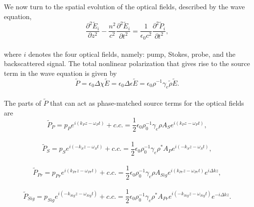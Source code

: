 We now turn to the spatial evolution of the optical fields, described by the wave equation,
\\
\begin{equation}
    \frac{\partial^{2}\tilde{E}_{i}}{\partial z^{2}} - \frac{n^{2}}{c^{2}}\frac{\partial^{2}\tilde{E}_{i}}{\partial t^{2}} = \frac{1}{\epsilon_{0}c^{2}}\frac{\partial^{2}\tilde{P}_{i}}{\partial t^{2}},
    \label{eq:Wave equation}
\end{equation}
\\
where \(i\) denotes the four optical fields, namely: pump, Stokes, probe, and the backscattered signal. The total nonlinear polarization that gives rise to the source term in the wave equation is given by
\\
\begin{equation}
    \tilde{P} = \epsilon_{0}\Delta\chi\tilde{E} = \epsilon_{0}\Delta\epsilon\tilde{E} = \epsilon_{0}\rho^{-1}\gamma_{e}\tilde{\rho}\tilde{E}.
\end{equation}
\\
The parts of \(\tilde{P}\) that can act as phase-matched source terms for the optical fields are
\\
\begin{equation}
    \tilde{P}_{P} = p_{P}e^{i(k_{P}z - \omega_{P} t)} + c.c. = \frac{1}{2}\epsilon_{0}\rho_{0}^{-1}\gamma_{e}\rho A_{S}e^{i(k_{P}z - \omega_{P} t)},
    \label{eq:Pump phase-matched source term}
\end{equation}
\\
\begin{equation}
    \tilde{P}_{S} = p_{S}e^{i(-k_{S}z - \omega_{S} t)} + c.c. = \frac{1}{2}\epsilon_{0}\rho_{0}^{-1}\gamma_{e}\rho^{*} A_{P}e^{i(-k_{S}z - \omega_{S} t)},
    \label{eq:Stokes phase-matched source term}
\end{equation}
\\
\begin{equation}
    \tilde{P}_{Pr} = p_{Pr}e^{i(k_{Pr}z - \omega_{Pr} t)} + c.c. = \frac{1}{2}\epsilon_{0}\rho_{0}^{-1}\gamma_{e}\rho A_{Sig}e^{i(k_{Pr}z - \omega_{Pr} t)}e^{i\Delta kz},
    \label{eq:Probe phase-matched source term}
\end{equation}
\\
\begin{equation}
    \tilde{P}_{Sig} = p_{Sig}e^{i(-k_{Sig}z - \omega_{Sig} t)} + c.c. = \frac{1}{2}\epsilon_{0}\rho_{0}^{-1}\gamma_{e}\rho^{*} A_{Pr}e^{i(-k_{Sig}z - \omega_{Sig} t)}e^{-i\Delta kz}.
    \label{eq:Signal phase-matched source term}
\end{equation}
